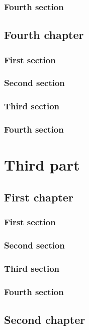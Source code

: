 \documentclass{researchbook}
\theoremstyle{plain}
\theoremstyle{definition}
\theoremstyle{remark}
\begin{document}
\section{Fourth section}\lipsum


\chapter{Fourth chapter}

\section{First section}\lipsum
\section{Second section}\lipsum
\section{Third section}\lipsum
\section{Fourth section}\lipsum


\part{Third part}
\chapter{First chapter}

\section{First section}\lipsum
\section{Second section}\lipsum
\section{Third section}\lipsum
\section{Fourth section}\lipsum


\chapter{Second chapter}
\end{document}
